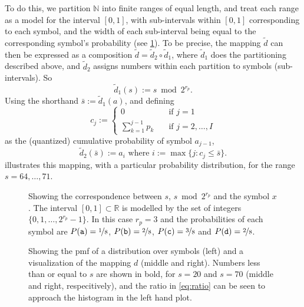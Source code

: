 \documentclass{article}
\begin{document}
To do this, we partition \(\mathbb{N}\) into finite ranges of equal length, and
treat each range as a model for the interval \([0, 1]\), with sub-intervals
within \([0, 1]\) corresponding to each symbol, and the width of each
sub-interval being equal to the corresponding symbol's probability (see
\cref{fig:interval}). To be precise, the mapping \(\tilde d\) can then be
expressed as a composition \(\tilde d = \tilde d_2 \circ \tilde d_1\), where
\(\tilde d_1\) does the partitioning described above, and \(\tilde d_2\)
assigns numbers within each partition to symbols (sub-intervals). So
\begin{equation}
  \tilde d_1(s) := s \bmod 2^{r_p}.
\end{equation}
Using the shorthand \(\bar{s} := \tilde d_1 (a)\), and defining
\begin{equation}
  c_j := \begin{cases}
    0                    &\quad\text{if }j=1\\
    \sum_{k=1}^{j-1} p_k &\quad\text{if }j=2,\ldots,I
  \end{cases}
\end{equation}
as the (quantized) cumulative probability of symbol \(a_{j-1}\),
\begin{equation}
  \tilde d_2(\bar s) := a_i\text{ where }i := \max \{j : c_j \leq \bar s\}.
\end{equation}
 illustrates this mapping, with a particular probability
distribution, for the range \(s = 64,\ldots, 71\).

\begin{figure}[ht]
  \centering
  \drawinterval
  \caption{
    Showing the correspondence between \(s\), \(s \bmod 2^{r_p}\) and the
    symbol \(x\). The interval \([0, 1]\subset\mathbb{R}\) is modelled by the
    set of integers \(\{0, 1, \ldots, 2^{r_p} - 1\}\). In this case \(r_p = 3\)
    and the probabilities of each symbol are \(P(\mathtt a) =
    \nicefrac{1}{8}\), \(P(\mathtt b) = \nicefrac{2}{8}\), \(P(\mathtt c) =
    \nicefrac{3}{8}\) and \(P(\mathtt d) = \nicefrac{2}{8}\).}
  \label{fig:interval}
\end{figure}

\begin{figure}[ht]
  \centering
  \drawpmf \quad {} \quad {}
  \caption{
    Showing the pmf of a distribution over symbols (left) and a visualization
    of the mapping \(d\) (middle and right).  Numbers less than or equal to
    \(s\) are shown in bold, for \(s=20\) and \(s=70\) (middle and right,
    respecitively), and the ratio in \cref{eq:ratio} can be seen to approach
    the histogram in the left hand plot.
  }\label{fig:visual-ans}
\end{figure}
\end{document}
